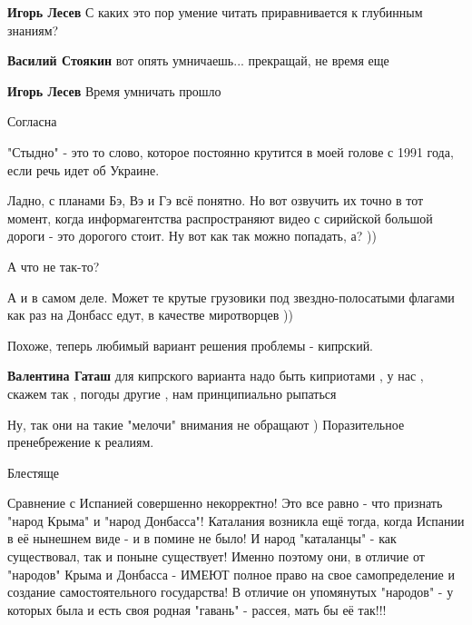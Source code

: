 \begin{itemize}
\begin{itemize}
\textbf{Игорь Лесев} С каких это пор умение читать приравнивается к глубинным знаниям?

\textbf{Василий Стоякин} вот опять умничаешь... прекращай, не время еще

\textbf{Игорь Лесев} Время умничать прошло
\end{itemize} %

Согласна

"Стыдно" - это то слово, которое постоянно крутится в моей голове с 1991 года, если речь идет об Украине.


Ладно, с планами Бэ, Вэ и Гэ всё понятно. Но вот озвучить их точно в тот
момент, когда информагентства распространяют видео с сирийской большой дороги -
это дорогого стоит. Ну вот как так можно попадать, а? ))

\begin{itemize} %
А что не так-то?

А и в самом деле. Может те крутые грузовики под звездно-полосатыми флагами как раз на Донбасс едут, в качестве миротворцев ))
\end{itemize} %

Похоже, теперь любимый вариант решения проблемы - кипрский.

\begin{itemize} %
\textbf{Валентина Гаташ} для кипрского варианта надо быть киприотами , у нас , скажем так , погоды другие , нам принципиально рыпаться

Ну, так они на такие "мелочи" внимания не обращают ) Поразительное пренебрежение к реалиям.
\end{itemize} %

Блестяще


Сравнение с Испанией совершенно некорректно! Это все равно - что признать
"народ Крыма" и "народ Донбасса"! Каталания возникла ещё тогда, когда Испании в
её нынешнем виде - и в помине не было! И народ "каталанцы" - как существовал,
так и поныне существует! Именно поэтому они, в отличие от "народов" Крыма и
Донбасса - ИМЕЮТ полное право на свое самопределение и создание
самостоятельного государства! В отличие он упомянутых "народов" - у которых
была и есть своя родная "гавань" - рассея, мать бы её так!!!


\end{itemize}
